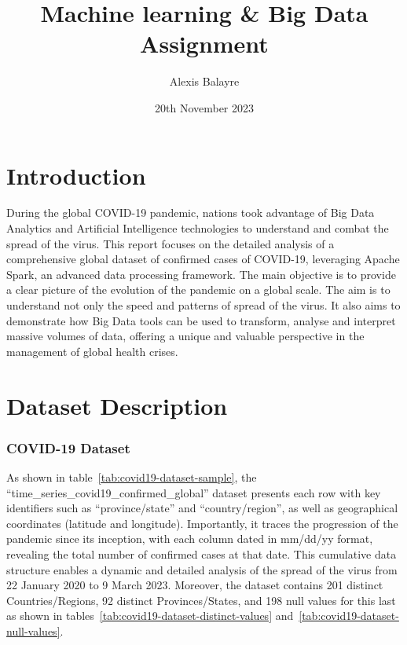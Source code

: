 \documentclass[12pt,oneside]{book} %
\title{Machine learning \& Big Data Assignment}
\author{Alexis Balayre}
\date{20th November 2023}
\begin{document}
\frontmatter

\maketitle

{
    \clearpage
    \singlespacing
    {
        \tableofcontents
    }
    \clearpage

    \listoffigures

    \listoftables
}

\mainmatter
\pagestyle{fancy}
\fancyhead[L]{\nouppercase{\leftmark}}
\fancyhead[R]{\nouppercase{\rightmark}}

\chapter{Introduction}
During the global COVID-19 pandemic, nations took advantage of Big Data
Analytics and Artificial Intelligence technologies to understand and combat the
spread of the virus. This report focuses on the detailed analysis of a
comprehensive global dataset of confirmed cases of COVID-19, leveraging Apache
Spark, an advanced data processing framework. The main objective is to provide
a clear picture of the evolution of the pandemic on a global scale. The aim is
to understand not only the speed and patterns of spread of the virus. It also
aims to demonstrate how Big Data tools can be used to transform, analyse and
interpret massive volumes of data, offering a unique and valuable perspective
in the management of global health crises.

\chapter{Dataset Description}

\subsection*{COVID-19 Dataset}

As shown in table~\ref{tab:covid19-dataset-sample}, the
``time\_series\_covid19\_confirmed\_global'' dataset presents each row with key
identifiers such as ``province/state'' and ``country/region'', as well as
geographical coordinates (latitude and longitude). Importantly, it traces the
progression of the pandemic since its inception, with each column dated in
mm/dd/yy format, revealing the total number of confirmed cases at that date.
This cumulative data structure enables a dynamic and detailed analysis of the
spread of the virus from 22 January 2020 to 9 March 2023. Moreover, the dataset
contains 201 distinct Countries/Regions, 92 distinct Provinces/States, and 198
null values for this last as shown in
tables~\ref{tab:covid19-dataset-distinct-values}
and~\ref{tab:covid19-dataset-null-values}.
\end{document}
